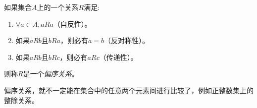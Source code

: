 \begin{definition}
  如果集合$A$上的一个关系$R$满足:
  \begin{enumerate}
  \item $\forall a \in A, aRa$（自反性）。
  \item 如果$aRb$且$bRa$，则必有$a=b$（反对称性）。
  \item 如果$aRb$且$bRc$，则必有$aRc$（传递性）。
  \end{enumerate}
  则称$R$是一个\emph{偏序关系}。
\end{definition}
偏序关系，就不一定能在集合中的任意两个元素间进行比较了，例如正整数集上的整除关系。

